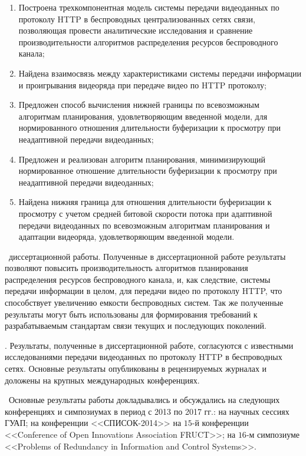 \novelty
\begin{enumerate}
    \item Построена трехкомпонентная модель системы передачи видеоданных по протоколу HTTP в беспроводных централизованных сетях связи, позволяющая провести аналитические исследования и сравнение производительности алгоритмов распределения ресурсов беспроводного канала;
    \item Найдена взаимосвязь между характеристиками системы передачи информации и проигрывания видеоряда при передаче видео по HTTP протоколу;
    \item Предложен способ вычисления нижней границы по всевозможным алгоритмам планирования, удовлетворяющим введенной модели, для нормированного отношения длительности буферизации к просмотру при неадаптивной передачи видеоданных;
    \item Предложен и реализован алгоритм планирования, минимизирующий нормированное отношение длительности буферизации к просмотру при неадаптивной передачи видеоданных;
    \item Найдена нижняя граница для отношения длительности буферизации к просмотру с учетом средней битовой скорости потока при адаптивной передачи видеоданных по всевозможным алгоритмам планирования и адаптации видеоряда, удовлетворяющим введенной модели.
\end{enumerate}

\influence\ диссертационной работы. Полученные в диссертационной работе результаты позволяют повысить производительность алгоритмов планирования распределения ресурсов беспроводного канала, и, как следствие, системы передачи информации в целом, для передачи видео по протоколу HTTP, что способствует увеличению емкости беспроводных систем. Так же полученные результаты могут быть использованы для формирования требований к разрабатываемым стандартам связи текущих и последующих поколений.

\reliability. Результаты, полученные в диссертационной работе, согласуются с известными исследованиями передачи видеоданных по протоколу HTTP в беспроводных сетях. Основные результаты опубликованы в рецензируемых журналах и доложены на крупных международных конференциях.

\probation\ Основные результаты работы докладывались и обсуждались на следующих конференциях и симпозиумах в период с 2013 по 2017 гг.: на научных сессиях ГУАП; на конференции <<СПИСОК-2014>> на $15$-й конференции <<Conference of Open Innovations Association FRUCT>>; на $16$-м симпозиуме <<Problems of Redundancy in Information and Control Systems>>.

